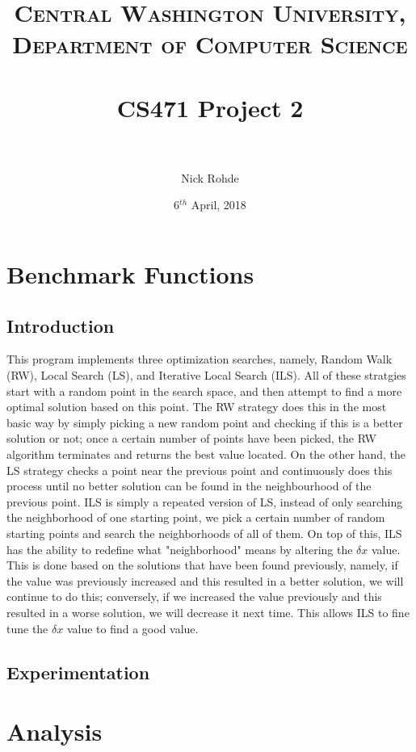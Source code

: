 \documentclass[paper=a4, fontsize=11pt]{scrartcl} %
\title{	
\normalfont \normalsize 
\textsc{Central Washington University, Department of Computer Science} \\ [25pt] %
\horrule{0.5pt} \\[0.4cm] %
\huge CS471 Project 2 \\ %
\horrule{2pt} \\[0.5cm] %
}
\author{Nick Rohde} %
\date{\normalsize 6$^{th}$ April, 2018} %
\numberwithin{equation}{section} %
\numberwithin{figure}{section} %
\numberwithin{table}{section} %
\begin{document}
\maketitle %


\section{Benchmark Functions}

	\subsection{Introduction}
	This program implements three optimization searches, namely, Random Walk (RW), Local Search (LS), and Iterative Local Search (ILS). All of these stratgies start with a random point in the search space, and then attempt to find a more optimal solution based on this point. The RW strategy does this in the most basic way by simply picking a new random point and checking if this is a better solution or not; once a certain number of points have been picked, the RW algorithm terminates and returns the best value located. On the other hand, the LS strategy checks a point near the previous point and continuously does this process until no better solution can be found in the neighbourhood of the previous point. ILS is simply a repeated version of LS, instead of only searching the neighborhood of one starting point, we pick a certain number of random starting points and search the neighborhoods of all of them. On top of this, ILS has the ability to redefine what "neighborhood" means by altering the $\delta x$ value. This is done based on the solutions that have been found previously, namely, if the value was previously increased and this resulted in a better solution, we will continue to do this; conversely, if we increased the value previously and this resulted in a worse solution, we will decrease it next time. This allows ILS to fine tune the $\delta x$ value to find a good value.
			
	\subsection{Experimentation}
	 
	\pagebreak
\section{Analysis}
\end{document}
